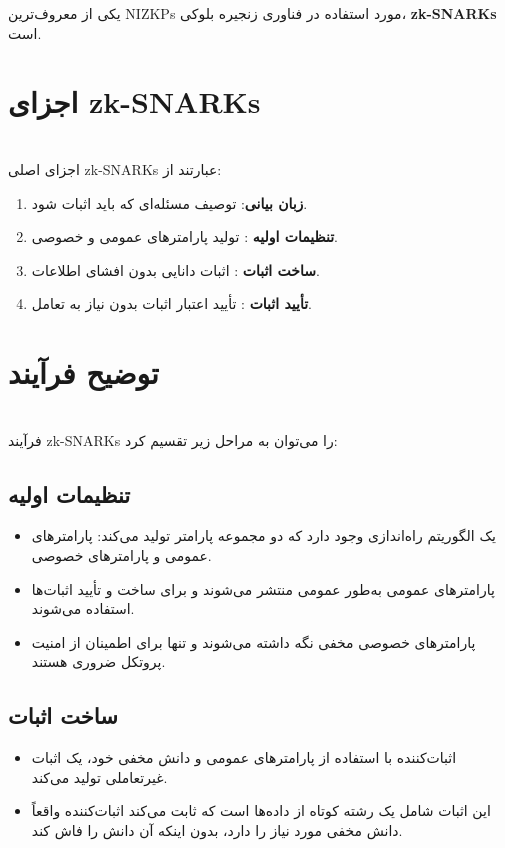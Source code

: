 \documentclass{article}
\begin{document}
یکی از معروف‌ترین NIZKPs مورد استفاده در فناوری زنجیره بلوکی، \textbf{zk-SNARKs}  است.

\section{اجزای zk-SNARKs}
\leavevmode
\\
اجزای اصلی zk-SNARKs عبارتند از:
\begin{enumerate}
    \item \textbf{زبان بیانی}: توصیف مسئله‌ای که باید اثبات شود.
    \item \textbf{تنظیمات اولیه }: تولید پارامترهای عمومی و خصوصی.
    \item \textbf{ساخت اثبات }: اثبات دانایی بدون افشای اطلاعات.
    \item \textbf{تأیید اثبات }: تأیید اعتبار اثبات بدون نیاز به تعامل.
\end{enumerate}

\section{توضیح فرآیند}
\leavevmode
\\
فرآیند zk-SNARKs را می‌توان به مراحل زیر تقسیم کرد:

\subsection{تنظیمات اولیه }
\begin{itemize}
    \item یک الگوریتم راه‌اندازی وجود دارد که دو مجموعه پارامتر تولید می‌کند: پارامترهای عمومی و پارامترهای خصوصی.
    \item پارامترهای عمومی به‌طور عمومی منتشر می‌شوند و برای ساخت و تأیید اثبات‌ها استفاده می‌شوند.
    \item پارامترهای خصوصی مخفی نگه داشته می‌شوند و تنها برای اطمینان از امنیت پروتکل ضروری هستند.
\end{itemize}

\subsection{ساخت اثبات }
\begin{itemize}
    \item اثبات‌کننده با استفاده از پارامترهای عمومی و دانش مخفی خود، یک اثبات غیرتعاملی تولید می‌کند.
    \item این اثبات شامل یک رشته کوتاه از داده‌ها است که ثابت می‌کند اثبات‌کننده واقعاً دانش مخفی مورد نیاز را دارد، بدون اینکه آن دانش را فاش کند.
\end{itemize}
\end{document}
